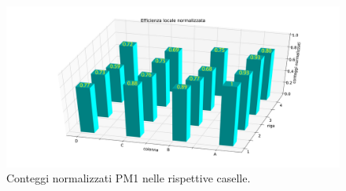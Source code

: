 \begin{figure}[h]
\flushleft
\includegraphics[width=17 cm]{3d_norm_rit}
\caption{Conteggi normalizzati PM1 nelle rispettive caselle.}
\label{secondo_capolavoro}
\end{figure}

